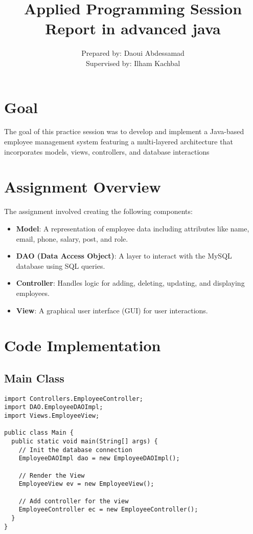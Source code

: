 \documentclass[12pt]{article}
\title{Applied Programming Session Report in advanced java}
\author{Prepared by: Daoui Abdessamad \\ Supervised by:  Ilham Kachbal}
\begin{document}
\maketitle

\newpage
\tableofcontents
\newpage

\section{Goal}
The goal of this practice session was to develop and implement a Java-based employee management system featuring a multi-layered architecture that incorporates models, views, controllers, and database interactions

\section{Assignment Overview}
The assignment involved creating the following components:
\begin{itemize}
    \item \textbf{Model}: A representation of employee data including attributes like name, email, phone, salary, post, and role.
    \item \textbf{DAO (Data Access Object)}: A layer to interact with the MySQL database using SQL queries.
    \item \textbf{Controller}: Handles logic for adding, deleting, updating, and displaying employees.
    \item \textbf{View}: A graphical user interface (GUI) for user interactions.
\end{itemize}

\section{Code Implementation}

\subsection{Main Class}
\begin{lstlisting}
import Controllers.EmployeeController;
import DAO.EmployeeDAOImpl;
import Views.EmployeeView;

public class Main {
  public static void main(String[] args) {
    // Init the database connection
    EmployeeDAOImpl dao = new EmployeeDAOImpl();

    // Render the View
    EmployeeView ev = new EmployeeView();

    // Add controller for the view
    EmployeeController ec = new EmployeeController();
  }
}
\end{lstlisting}
\end{document}
